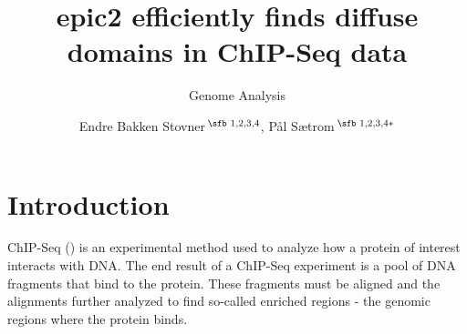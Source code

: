 \documentclass{bioinfo}
\begin{document}

\subtitle{Genome Analysis}

\title[short Title]{epic2 efficiently finds diffuse domains in ChIP-Seq data}
\author[Sample \textit{et~al}.]{Endre Bakken Stovner\,$^{\text{\sfb 1,2,3,4}}$,
  Pål Sætrom\,$^{\text{\sfb 1,2,3,4}*}$}
\address{$^{\text{\sf 1}}$Department of Computer Science, Norwegian University of Science
and Technology, Trondheim, 7013, Norway,
\\
$^{\text{\sf 2}}$Department of Clinical and Molecular Medicine, Norwegian
University of Science and Technology, Trondheim, 7013, Norway
\\
$^{\text{\sf 3}}$Bioinformatics Core Facility, Norwegian University of Science and Technology, Trondheim, 7013, Norway
\\
$^{\text{\sf 4}}$K.G. Jebsen Center for Genetic Epidemiology, Department of Public Health and Nursing, Norwegian University of Science and Technology, Trondheim, Norway}





\maketitle

\section{Introduction}

ChIP-Seq (\cite{10.1038/nrg2641}) is an experimental method used to analyze how a
protein of interest interacts with DNA. The end result of a ChIP-Seq experiment
is a pool of DNA fragments that bind to the protein. These fragments must be
aligned and the alignments further analyzed to find so-called enriched regions -
the genomic regions where the protein binds.
\end{document}
